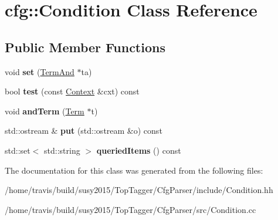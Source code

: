\hypertarget{classcfg_1_1Condition}{\section{cfg\-:\-:Condition Class Reference}
\label{classcfg_1_1Condition}
}
\subsection*{Public Member Functions}
\begin{DoxyCompactItemize}
\item 
\hypertarget{classcfg_1_1Condition_a9f6ab9de4b9a9b159fcf1f096d71e929}{void {\bfseries set} (\hyperlink{classcfg_1_1TermAnd}{Term\-And} $\ast$ta)}\label{classcfg_1_1Condition_a9f6ab9de4b9a9b159fcf1f096d71e929}

\item 
\hypertarget{classcfg_1_1Condition_acf5fa4f635143031a3a9a013ef000d8b}{bool {\bfseries test} (const \hyperlink{classcfg_1_1Context}{Context} \&cxt) const }\label{classcfg_1_1Condition_acf5fa4f635143031a3a9a013ef000d8b}

\item 
\hypertarget{classcfg_1_1Condition_a13d6af566359dcc425dd64970dfc8cf4}{void {\bfseries and\-Term} (\hyperlink{classcfg_1_1Term}{Term} $\ast$t)}\label{classcfg_1_1Condition_a13d6af566359dcc425dd64970dfc8cf4}

\item 
\hypertarget{classcfg_1_1Condition_ab6e1f28e69efd9e7d82698b486fffb7f}{std\-::ostream \& {\bfseries put} (std\-::ostream \&o) const }\label{classcfg_1_1Condition_ab6e1f28e69efd9e7d82698b486fffb7f}

\item 
\hypertarget{classcfg_1_1Condition_a6982764b31034fe97d41b38429786702}{std\-::set$<$ std\-::string $>$ {\bfseries queried\-Items} () const }\label{classcfg_1_1Condition_a6982764b31034fe97d41b38429786702}

\end{DoxyCompactItemize}


The documentation for this class was generated from the following files\-:\begin{DoxyCompactItemize}
\item 
/home/travis/build/susy2015/\-Top\-Tagger/\-Cfg\-Parser/include/Condition.\-hh\item 
/home/travis/build/susy2015/\-Top\-Tagger/\-Cfg\-Parser/src/Condition.\-cc\end{DoxyCompactItemize}
